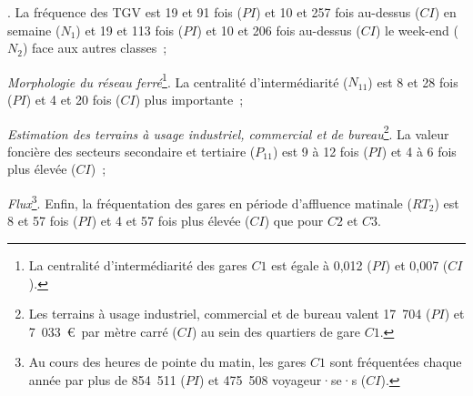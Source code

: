 \begin{refsegment}
\begin{customitemize}
{    }. La fréquence des \acrshort{TGV} est 19 et 91 fois (\(PI\)) et 10 et 257 fois au-dessus (\(CI\)) en semaine (\(N_{1}\)) et 19 et 113 fois (\(PI\)) et 10 et 206 fois au-dessus (\(CI\)) le week-end (\(N_{2}\)) face aux autres classes~;
    \item \textsl{Morphologie du réseau ferré}\footnote{
        La centralité d'intermédiarité des gares \(C1\) est égale à 0,012 (\(PI\)) et 0,007 (\(CI\)).
    }. La centralité d'intermédiarité (\(N_{11}\)) est 8 et 28 fois (\(PI\)) et 4 et 20 fois (\(CI\)) plus importante~;
    \item \textsl{Estimation des terrains à usage industriel, commercial et de bureau}\footnote{
        Les terrains à usage industriel, commercial et de bureau valent 17~704 (\(PI\)) et 7~033~\euro~par mètre carré (\(CI\)) au sein des quartiers de gare \(C1\).
    }. La valeur foncière des secteurs secondaire et tertiaire (\(P_{11}\)) est 9 à 12 fois (\(PI\)) et 4 à 6 fois plus élevée (\(CI\))~;
    \item \textsl{Flux}\footnote{
        Au cours des heures de pointe du matin, les gares \(C1\) sont fréquentées chaque année par plus de 854~511 (\(PI\)) et 475~508 voyageur·se·s (\(CI\)).
    }. Enfin, la fréquentation des gares en période d'affluence matinale (\(RT_{2}\)) est 8 et 57 fois (\(PI\)) et 4 et 57 fois plus élevée (\(CI\)) que pour \(C2\) et \(C3\).
\end{customitemize}%


\end{refsegment}
